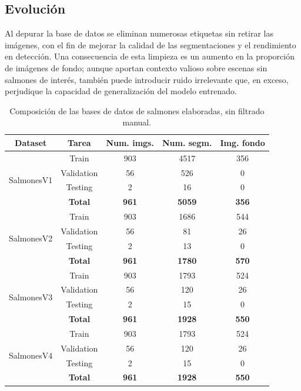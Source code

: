 \subsection{Evolución}
Al depurar la base de datos se eliminan numerosas etiquetas sin retirar las imágenes, con el fin de mejorar la calidad de las segmentaciones y el rendimiento en detección. Una consecuencia de esta limpieza es un aumento en la proporción de imágenes de fondo; aunque aportan contexto valioso sobre escenas sin salmones de interés, también puede introducir ruido irrelevante que, en exceso, perjudique la capacidad de generalización del modelo entrenado.

\begin{table}[htbp]
\centering
\caption[Composición de las bases de datos de salmones filtradas]{Composición de las bases de datos de salmones elaboradas, sin filtrado manual.}
\label{tab:salmones_evolution}
\begin{tabular}{|c|c|c|c|c|}
\hline
\textbf{Dataset} & \textbf{Tarea} & \textbf{Num. imgs.} & \textbf{Num. segm.} & \textbf{Img. fondo} \\ \hline
\multirow{4}{*}{SalmonesV1} & Train & 903 & 4517 & 356 \\ \cline{2-5} 
 & Validation & 56 & 526 & 0 \\ \cline{2-5} 
 & Testing & 2 & 16 & 0 \\ \cline{2-5} 
 & \textbf{Total} & \textbf{961} & \textbf{5059} & \textbf{356} \\ \hline
\multirow{4}{*}{SalmonesV2} & Train & 903 & 1686 & 544 \\ \cline{2-5} 
 & Validation & 56 & 81 & 26 \\ \cline{2-5} 
 & Testing & 2 & 13 & 0 \\ \cline{2-5} 
 & \textbf{Total} & \textbf{961} & \textbf{1780} & \textbf{570} \\ \hline
\multirow{4}{*}{SalmonesV3} & Train & 903 & 1793 & 524 \\ \cline{2-5} 
 & Validation & 56 & 120 & 26 \\ \cline{2-5} 
 & Testing & 2 & 15 & 0 \\ \cline{2-5} 
 & \textbf{Total} & \textbf{961} & \textbf{1928} & \textbf{550} \\ \hline
\multirow{4}{*}{SalmonesV4} & Train & 903 & 1793 & 524 \\ \cline{2-5} 
 & Validation & 56 & 120 & 26 \\ \cline{2-5} 
 & Testing & 2 & 15 & 0 \\ \cline{2-5} 
 & \textbf{Total} & \textbf{961} & \textbf{1928} & \textbf{550} \\ \hline
\end{tabular}
\end{table}


